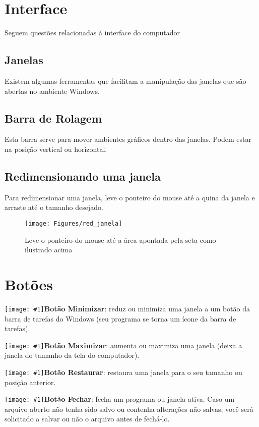 \documentclass[hidelinks,12pt]{article}
\newcommand{\icon}[1]{\texttt{[image: \#1]}}
\begin{document}
	\section{Interface}
	Seguem questões relacionadas à interface do computador

	\subsection{Janelas}
	Existem algumas ferramentas que facilitam a manipulação das janelas que são abertas no ambiente Windows.

	\subsection{Barra de Rolagem}
	Esta barra serve para mover ambientes gráficos dentro das janelas. Podem estar na posição vertical ou horizontal.

	\subsection{Redimensionando uma janela}
	Para redimensionar uma janela, leve o ponteiro do mouse até a quina da janela e arraste até o tamanho desejado.

	\begin{figure}[!h]
		\centering
		\texttt{[image: Figures/red\_janela]}
		\caption{Leve o ponteiro do mouse até a área apontada pela seta como ilustrado acima}
		\label{fig:redimensionando janela}

	\end{figure}


	\section{Botões}


	\noindent \icon{Figures/minimizar}{\bf Botão Minimizar}: reduz ou minimiza uma janela a um botão da barra de tarefas do Windows (seu programa se torna um ícone da barra de tarefas).

	\noindent\icon{Figures/maximizar}{\bf Botão Maximizar}: aumenta ou maximiza uma janela (deixa a janela do tamanho da tela do computador).

	\noindent\icon{Figures/restaurar}{\bf Botão Restaurar}: restaura uma janela para o seu tamanho ou posição anterior.

	\noindent\icon{Figures/fechar}{\bf Botão Fechar}: fecha um programa ou janela ativa. Caso um arquivo aberto não tenha sido salvo ou contenha alterações não salvas, você será solicitado a salvar ou não o arquivo antes de fechá-lo.
	
\end{document}
